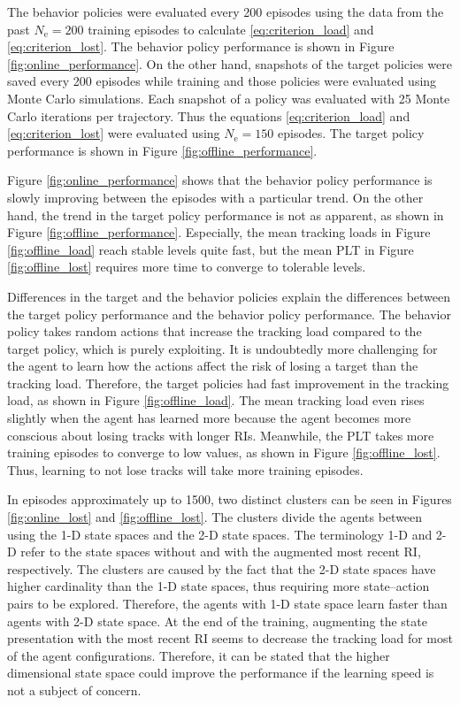 \documentclass[english, 12pt, a4paper, elec, utf8, a-1b, online]{aaltothesis}
\numberwithin{equation}{section}
\newcommand{\Ne}{N_\text{e}}
\begin{document}
The behavior policies were evaluated every 200 episodes using the data from the past $\Ne=200$ training episodes to calculate \eqref{eq:criterion_load} and \eqref{eq:criterion_lost}.
The behavior policy performance is shown in Figure \ref{fig:online_performance}.
On the other hand, snapshots of the target policies were saved every 200 episodes while training and those policies were evaluated using Monte Carlo simulations.
Each snapshot of a policy was evaluated with 25 Monte Carlo iterations per trajectory.
Thus the equations \eqref{eq:criterion_load} and \eqref{eq:criterion_lost} were evaluated using $\Ne=150$ episodes.
The target policy performance is shown in Figure \ref{fig:offline_performance}.


Figure \ref{fig:online_performance} shows that the behavior policy performance is slowly improving between the episodes with a particular trend.
On the other hand, the trend in the target policy performance is not as apparent, as shown in Figure \ref{fig:offline_performance}.
Especially, the mean tracking loads in Figure \ref{fig:offline_load} reach stable levels quite fast, but the mean PLT in Figure \ref{fig:offline_lost} requires more time to converge to tolerable levels.

Differences in the target and the behavior policies explain the differences between the target policy performance and the behavior policy performance.
The behavior policy takes random actions that increase the tracking load compared to the target policy, which is purely exploiting.
It is undoubtedly more challenging for the agent to learn how the actions affect the risk of losing a target than the tracking load.
Therefore, the target policies had fast improvement in the tracking load, as shown in Figure \ref{fig:offline_load}. 
The mean tracking load even rises slightly when the agent has learned more because the agent becomes more conscious about losing tracks with longer RIs.
Meanwhile, the PLT takes more training episodes to converge to low values, as shown in Figure \ref{fig:offline_lost}.
Thus, learning to not lose tracks will take more training episodes.


In episodes approximately up to 1500, two distinct clusters can be seen in Figures \ref{fig:online_lost} and \ref{fig:offline_lost}.
The clusters divide the agents between using the 1-D state spaces and the 2-D state spaces.
The terminology 1-D and 2-D refer to the state spaces without and with the augmented most recent RI, respectively.
The clusters are caused by the fact that the 2-D state spaces have higher cardinality than the 1-D state spaces, thus requiring more state--action pairs to be explored.
Therefore, the agents with 1-D state space learn faster than agents with 2-D state space.
At the end of the training, augmenting the state presentation with the most recent RI seems to decrease the tracking load for most of the agent configurations. 
Therefore, it can be stated that the higher dimensional state space could improve the performance if the learning speed is not a subject of concern.
\end{document}
